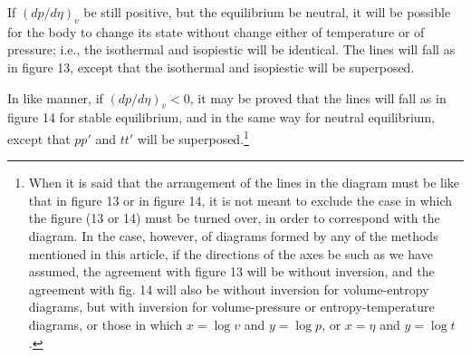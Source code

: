 \documentclass[11pt]{article}
\begin{document}
\begin{figure}[h]
\centering
{}
\end{figure}

If $\left(dp/d\eta\right)_v$ be still positive, but the equilibrium be neutral, it will be possible for the body to change its state without change either of temperature or of pressure; i.e., the isothermal and isopiestic will be identical. The lines will fall as in figure 13, except that the isothermal and isopiestic will be superposed.

In like manner, if $\left(dp/d\eta\right)_v<0$, it may be proved that the lines will fall as in figure 14 for stable equilibrium, and in the same way for neutral equilibrium, except that $pp'$ and $tt'$ will be superposed.\footnote{When it is said that the arrangement of the lines in the diagram must be like that in figure 13 or in figure 14, it is not meant to exclude the case in which the figure (13 or 14) must be turned over, in order to correspond with the diagram. In the case, however, of diagrams formed by any of the methods mentioned in this article, if the directions of the axes be such as we have assumed, the agreement with figure 13 will be without inversion, and the agreement with fig. 14 will also be without inversion for volume-entropy diagrams, but with inversion for volume-pressure or entropy-temperature diagrams, or those in which $x=\log v$ and $y=\log p$, or $x=\eta$ and $y=\log t$.}
\end{document}
